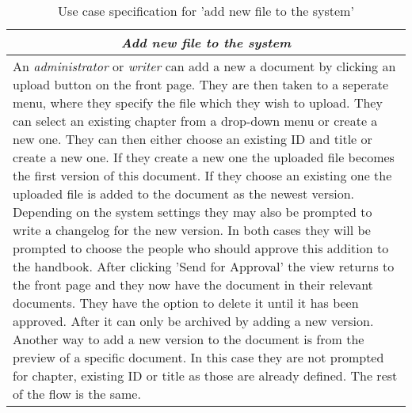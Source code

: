 \begin{table}
\centering
\begin{tabular}{p{12cm}}
\hline
\multicolumn{1}{c}{\textit{\textbf{Add new file to the system}}} \\
\hline
An \textit{administrator} or \textit{writer} can add a new a document by clicking an upload button on the front page.
They are then taken to a seperate menu, where they specify the file which they wish to upload.
They can select an existing chapter from a drop-down menu or create a new one. 
They can then either choose an existing ID and title or create a new one.
If they create a new one the uploaded file becomes the first version of this document.
If they choose an existing one the uploaded file is added to the document as the newest version.
Depending on the system settings they may also be prompted to write a changelog for the new version.
In both cases they will be prompted to choose the people who should approve this addition to the handbook.
After clicking 'Send for Approval' the view returns to the front page and they now have the document in their relevant documents.
They have the option to delete it until it has been approved.
After it can only be archived by adding a new version.
Another way to add a new version to the document is from the preview of a specific document.
In this case they are not prompted for chapter, existing ID or title as those are already defined.
The rest of the flow is the same.
\\\hline
\end{tabular}
\caption{Use case specification for 'add new file to the system'}\label{tab:add-file}
\end{table}